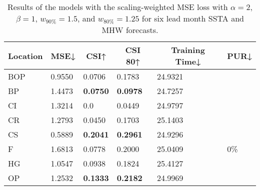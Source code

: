 \documentclass[11pt, a4paper]{article}
\begin{document}
\begin{table}[H]
\centering
\small
\caption{Results of the models with the scaling-weighted MSE loss with $\alpha=2$, $\beta=1$, $w_{90\%}=1.5$, and $w_{80\%}=1.25$ for six lead month SSTA and MHW forecasts.}
\begin{tabular}{llllll}
\multicolumn{1}{c}{\textbf{Location}} & \multicolumn{1}{c}{\textbf{MSE↓}} & \multicolumn{1}{c}{\textbf{CSI↑}} & \multicolumn{1}{c}{\textbf{CSI 80↑}} & \multicolumn{1}{c}{\textbf{Training Time↓}} & \multicolumn{1}{c}{\textbf{PUR↓}} \\ \hline
BOP                         & 0.9550                            & 0.0706                            & 0.1783                               & 24.9321                                     &                                   \\
BP                        & 1.4473                            & \textbf{0.0750}                   & \textbf{0.0978}                      & 24.7257                                     &                                   \\
CI                        & 1.3214                            & 0.0                               & 0.0449                               & 24.9797                                     &                                   \\
CR                           & 1.2793                            & 0.0450                            & 0.1703                               & 25.1403                                     &                                   \\
CS                           & 0.5889                            & \textbf{0.2041}                   & \textbf{0.2961}                      & 24.9296                                     &                                   \\
F                             & 1.6813                            & 0.0778                            & 0.2000                               & 25.0409                                     & 0\%                               \\
HG                          & 1.0547                            & 0.0938                            & 0.1824                               & 25.4127                                     &                                   \\
OP                       & 1.2532                            & \textbf{0.1333}                   & \textbf{0.2182}                      & 24.9969                                     &                                   \\

\end{tabular}
\end{table}
\end{document}
